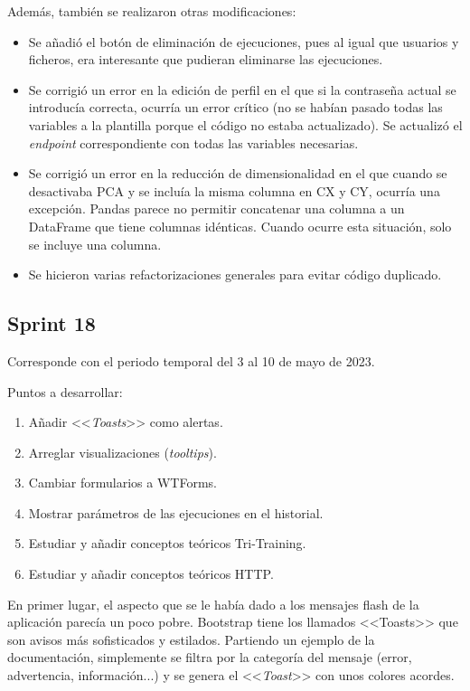 Además, también se realizaron otras modificaciones:

\begin{itemize}
    \item Se añadió el botón de eliminación de ejecuciones, pues al igual que
    usuarios y ficheros, era interesante que pudieran eliminarse las
    ejecuciones.
    \item Se corrigió un error en la edición de perfil en el que si la
contraseña actual se introducía correcta, ocurría un error crítico (no se habían
pasado todas las variables a la plantilla porque el código no estaba
actualizado). Se actualizó el \textit{endpoint} correspondiente con todas las
variables necesarias.
    \item Se corrigió un error en la reducción de dimensionalidad en el que
cuando se desactivaba PCA y se incluía la misma columna en CX y CY, ocurría una
excepción. Pandas parece no permitir concatenar una columna a un DataFrame que
tiene columnas idénticas. Cuando ocurre esta situación, solo se incluye una
columna.
    \item Se hicieron varias refactorizaciones generales para evitar código duplicado.
\end{itemize}

\subsection{Sprint 18}
Corresponde con el periodo temporal del 3 al 10 de mayo de 2023.

Puntos a desarrollar:
\begin{enumerate}
    \item Añadir <<\textit{Toasts}>> como alertas.
    \item Arreglar visualizaciones (\textit{tooltips}).
    \item Cambiar formularios a WTForms.
    \item Mostrar parámetros de las ejecuciones en el historial.
    \item Estudiar y añadir conceptos teóricos Tri-Training.
    \item Estudiar y añadir conceptos teóricos HTTP.
\end{enumerate}

En primer lugar, el aspecto que se le había dado a los mensajes flash de la
aplicación parecía un poco pobre. Bootstrap tiene los llamados <<Toasts>> que
son avisos más sofisticados y estilados. Partiendo un ejemplo de la
documentación, simplemente se filtra por la categoría del mensaje (error,
advertencia, información...) y se genera el <<\textit{Toast}>> con unos colores
acordes.


